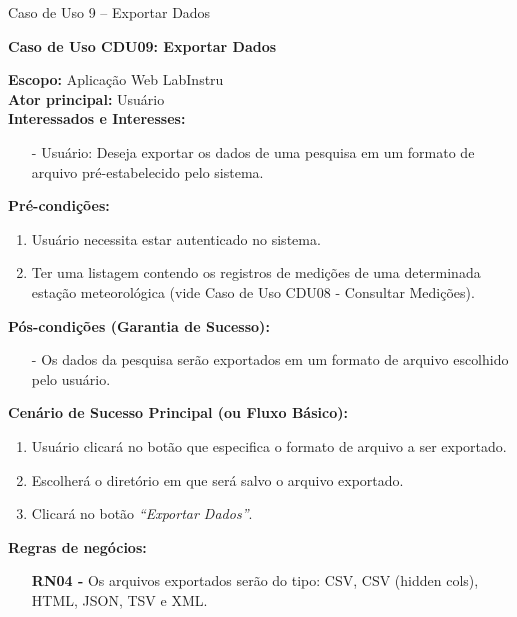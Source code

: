 \begin{quadro}[h!]\caption{Caso de Uso 9 --  Exportar Dados}
\hfill
\end{quadro}
	\begin{mdframed}

		\textbf{Caso de Uso CDU09: Exportar Dados}\\

		\begin{flushleft}

		\textbf{Escopo:} Aplicação Web LabInstru\\

		\textbf{Ator principal:} Usuário\\

		\textbf{Interessados e Interesses:}
		\begin{itemize}
			\item[-] Usuário: Deseja exportar os dados de uma pesquisa em um formato de arquivo pré-estabelecido pelo sistema.
		\end{itemize}

		\textbf{Pré-condições:}\\
			 \begin{enumerate}
			 	\item{Usuário necessita estar autenticado no sistema.}
			 	\item{Ter uma listagem contendo os registros de medições de uma determinada estação meteorológica (vide Caso de Uso CDU08 - Consultar Medições).}
			 \end{enumerate}

		\textbf{Pós-condições (Garantia de Sucesso):}
		\begin{itemize}
		\item[-] Os dados da pesquisa serão exportados em um formato de arquivo escolhido pelo usuário.
		\end{itemize}

		\textbf{Cenário de Sucesso Principal (ou Fluxo Básico):}\\
			\begin{enumerate}
			 	\item{Usuário clicará no botão que especifica o formato de arquivo a ser exportado.}
			 	\item{Escolherá o diretório em que será salvo o arquivo exportado.}
			 	\item{Clicará no botão \textit{``Exportar Dados''}.}
			 \end{enumerate}

		\textbf{Regras de negócios:}
		\begin{itemize}
			\item[] \textbf{RN04 - } Os arquivos exportados serão do tipo: CSV, CSV (hidden cols), HTML, JSON, TSV e XML.
		\end{itemize}
		\end{flushleft}

	\end{mdframed}

